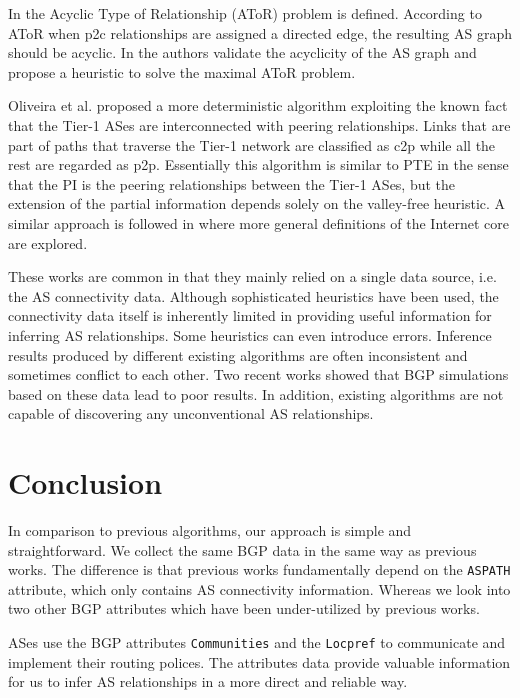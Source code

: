 \documentclass[conference]{IEEEtran}
\begin{document}
In \cite{Cohen:2007} the Acyclic Type of Relationship (AToR) problem is defined. According to AToR when p2c relationships are assigned a directed edge, the resulting AS graph should be acyclic. In \cite{Hummel:2007} the authors validate the acyclicity of the AS graph and propose a heuristic to solve the maximal AToR problem.

Oliveira et al. \cite{Oliveira2} proposed a more deterministic algorithm exploiting the known fact that the Tier-1 ASes are interconnected with peering relationships. Links that are part of paths that traverse the Tier-1 network are classified as c2p while all the rest are regarded as p2p. Essentially this algorithm is similar to PTE in the sense that the PI is the peering relationships between the Tier-1 ASes, but the extension of the partial information depends solely on the valley-free heuristic. A similar approach is followed in \cite{Weinsberg1} where more general definitions of the Internet core are explored.

These works are common in that they mainly relied on a single data source, i.e. the AS connectivity data. Although sophisticated heuristics have been used, the connectivity data itself is inherently limited in providing useful information for inferring AS relationships. Some  heuristics can even introduce errors. 
Inference results produced by different existing algorithms are often inconsistent and sometimes conflict to each other. 
Two recent works \cite{Muhlbauer:2006,Muhlbauer:2007} showed that BGP simulations based on these data lead to poor results. 
In addition, existing algorithms are not capable of discovering any unconventional AS relationships.   




\section{Conclusion}

In comparison to previous algorithms, our approach is  simple and straightforward. 
We  collect the same BGP data in the same way as previous works. The difference is that previous works fundamentally depend on the {\tt ASPATH} attribute, which only contains AS connectivity information. Whereas we look into two other BGP attributes which have been under-utilized by previous works. 


ASes use the  BGP attributes {\tt  Communities} and the {\tt Locpref}  
to communicate and implement their routing polices. The attributes data provide valuable information for us to infer AS relationships in a more direct and reliable way.
\end{document}
